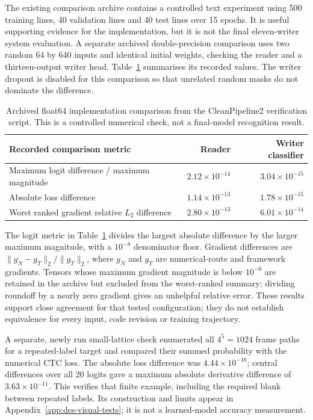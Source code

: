 The existing comparison archive contains a controlled text experiment using 500 training lines, 40 validation lines and 40 test lines over 15 epochs. It is useful supporting evidence for the implementation, but it is not the final eleven-writer system evaluation. A separate archived double-precision comparison uses two random 64 by 640 inputs and identical initial weights, checking the reader and a thirteen-output writer head. Table~\ref{tab:des-numericalcheck} summarises its recorded values. The writer dropout is disabled for this comparison so that unrelated random masks do not dominate the difference.


\begin{table}[H]\centering\small
\begin{tabularx}{\linewidth}{|X|r|r|}
\hline\textbf{Recorded comparison metric}&\textbf{Reader}&\textbf{Writer classifier}\\\hline
Maximum logit difference / maximum magnitude&$2.12\times10^{-14}$&$3.04\times10^{-15}$\\\hline
Absolute loss difference&$1.14\times10^{-13}$&$1.78\times10^{-15}$\\\hline
Worst ranked gradient relative $L_2$ difference&$2.80\times10^{-13}$&$6.01\times10^{-14}$\\\hline
\end{tabularx}
\caption{Archived float64 implementation comparison from the CleanPipeline2 verification script. This is a controlled numerical check, not a final-model recognition result.}
\label{tab:des-numericalcheck}
\end{table}

The logit metric in Table~\ref{tab:des-numericalcheck} divides the largest absolute difference by the larger maximum magnitude, with a $10^{-8}$ denominator floor. Gradient differences are $\|g_N-g_T\|_2/\|g_T\|_2$, where $g_N$ and $g_T$ are numerical-route and framework gradients. Tensors whose maximum gradient magnitude is below $10^{-6}$ are retained in the archive but excluded from the worst-ranked summary: dividing roundoff by a nearly zero gradient gives an unhelpful relative error. These results support close agreement for that tested configuration; they do not establish equivalence for every input, code revision or training trajectory.


A separate, newly run small-lattice check enumerated all $4^5=1024$ frame paths for a repeated-label target and compared their summed probability with the numerical CTC loss. The absolute loss difference was $4.44\times10^{-16}$; central differences over all 20 logits gave a maximum absolute derivative difference of $3.63\times10^{-11}$. This verifies that finite example, including the required blank between repeated labels. Its construction and limits appear in Appendix~\ref{app:des-visual-tests}; it is not a learned-model accuracy measurement.


